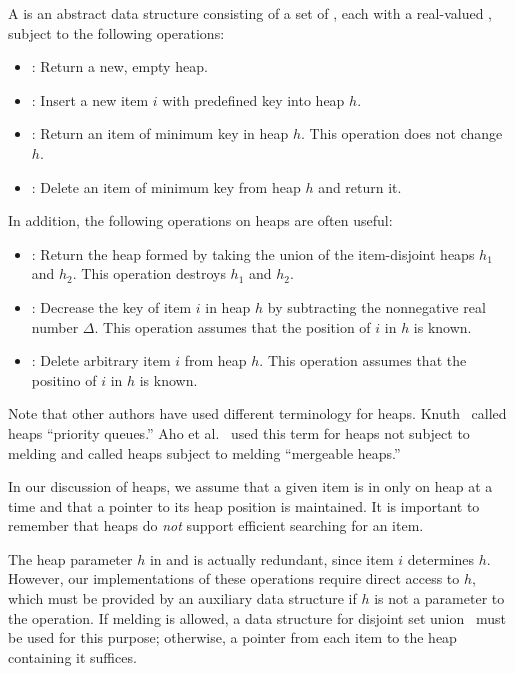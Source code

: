 A  is an abstract data structure consisting of a set of , each
with a real-valued , subject to the following operations:
\begin{itemize}
    \item {}: Return a new, empty heap.
    \item {}: Insert a new item \(i\) with predefined key into heap
        \(h\).
    \item {}: Return an item of minimum key in heap \(h\). This
        operation does not change \(h\).
    \item {}: Delete an item of minimum key from heap \(h\) and
        return it.
\end{itemize}

In addition, the following operations on heaps are often useful:
\begin{itemize}
    \item {}: Return the heap formed by taking the union of the
        item-disjoint heaps \(h_1\) and \(h_2\). This operation destroys \(h_1\) and
        \(h_2\).
    \item {}: Decrease the key of item \(i\) in heap
        \(h\) by subtracting the nonnegative real number \(\Delta\). This operation
        assumes that the position of \(i\) in \(h\) is known.
    \item {}: Delete arbitrary item \(i\) from heap \(h\). This
        operation assumes that the positino of \(i\) in \(h\) is known.
\end{itemize}

Note that other authors have used different terminology for heaps.  Knuth~%
\cite{TAOCP1} called heaps ``priority queues.'' Aho et al.~\cite{Aho+1974} used
this term for heaps not subject to melding and called heaps subject to melding
``mergeable heaps.''

In our discussion of heaps, we assume that a given item is in only on heap at a time
and that a pointer to its heap position is maintained. It is important to remember
that heaps do \emph{not} support efficient searching for an item.

\begin{remark}
    The heap parameter \(h\) in  and  is actually
    redundant, since item \(i\) determines \(h\). However, our implementations of
    these operations require direct access to \(h\), which must be provided by an
    auxiliary data structure if \(h\) is not a parameter to the operation. If melding
    is allowed, a data structure for disjoint set union~\cite{TarjanVanLeeuwen1984}
    must be used for this purpose; otherwise, a pointer from each item to the heap
    containing it suffices.
\end{remark}

